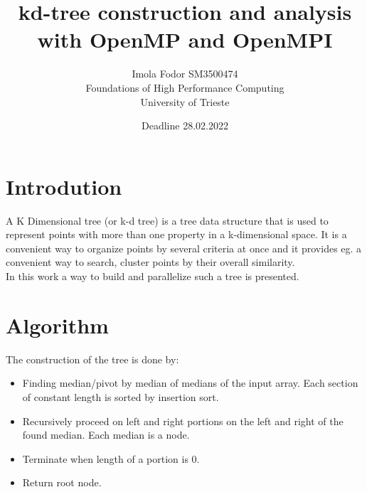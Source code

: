 \documentclass[11pt]{article}
\title{kd-tree construction and analysis with OpenMP and OpenMPI}
\date{Deadline 28.02.2022}
\author{Imola Fodor SM3500474 \\Foundations of High Performance Computing \\University of Trieste}
\begin{document}
\maketitle
\tableofcontents

\newpage

\section{Introdution}
A K Dimensional tree (or k-d tree) is a tree data structure that is used to represent points with more than one property in a k-dimensional space. It is a convenient way to organize points by several criteria at once and it provides eg. a convenient way to search, cluster points by their overall similarity. \\ In this work a way to build and parallelize such a tree is presented.
\section{Algorithm}
The construction of the tree is done by:
\begin{itemize}
  \item Finding median/pivot by median of medians of the input array. Each section of constant length is sorted by insertion sort. 
  \item Recursively proceed on left and right portions on the left and right of the found median. Each median is a node.
  \item Terminate when length of a portion is 0. 
  \item Return root node.
\end{itemize}
\end{document}
